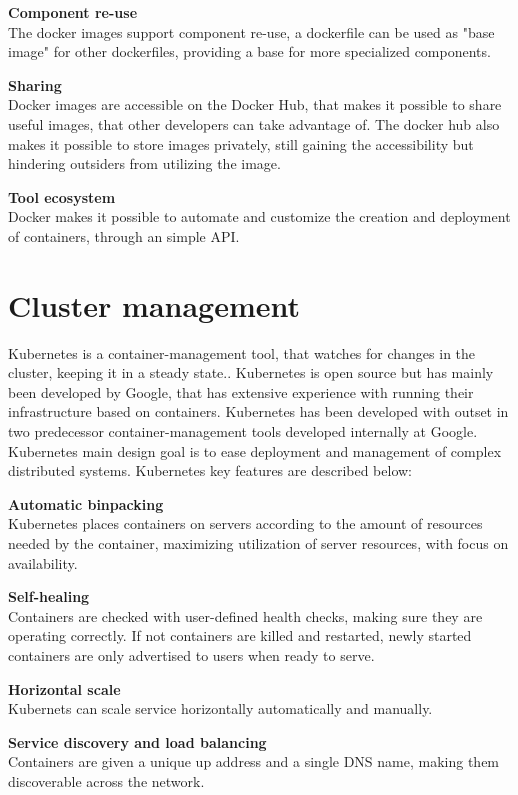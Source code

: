 \textbf{Component re-use}\\
The docker images support component re-use, a dockerfile can be used as "base image" for other dockerfiles, providing a base for more specialized components.

\textbf{Sharing}\\
Docker images are accessible on the Docker Hub, that makes it possible to share useful images, that other developers can take advantage of. The docker hub also makes it possible to store images privately, still gaining the accessibility but hindering outsiders from utilizing the image.

\textbf{Tool ecosystem}\\
Docker makes it possible to automate and customize the creation and deployment of containers, through an simple API.

\section{Cluster management}
Kubernetes is a container-management tool, that watches for changes in the cluster, keeping it in a steady state.\cite{burns2016borg}. Kubernetes is open source but has mainly been developed by Google, that has extensive experience with running their infrastructure based on containers. Kubernetes has been developed with outset in two predecessor container-management tools developed internally at Google. Kubernetes main design goal is to ease deployment and management of complex distributed systems\cite{kubernetes_frontpage}. Kubernetes key features are described below:

\textbf{Automatic binpacking}\\
Kubernetes places containers on servers according to the amount of resources needed by the container, maximizing utilization of server resources, with focus on availability.

\textbf{Self-healing}\\
Containers are checked with user-defined health checks, making sure they are operating correctly. If not containers are killed and restarted, newly started containers are only advertised to users when ready to serve.

\textbf{Horizontal scale}\\
Kubernets can scale service horizontally automatically and manually.

\textbf{Service discovery and load balancing}\\
Containers are given a unique up address and a single DNS name, making them discoverable across the network.

